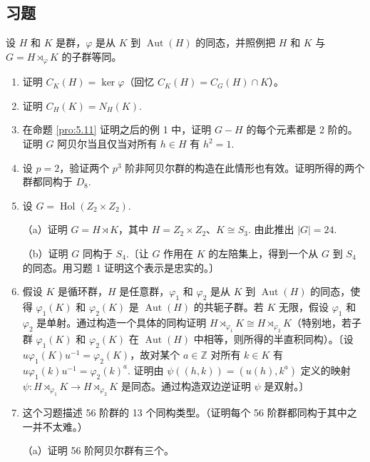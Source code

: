 \subsection*{习题}
设 \(H\) 和 \(K\) 是群，\(\varphi\) 是从 \(K\) 到 \(\operatorname{Aut}(H)\) 的同态，并照例把 \(H\) 和 \(K\) 与 \(G = H \rtimes_\varphi K\) 的子群等同。

\begin{enumerate}
\item 证明 \(C_K(H) = \ker \varphi\)（回忆 \(C_K(H) = C_G(H) \cap K\)）。

\item 证明 \(C_H(K) = N_H(K)\).

\item 在命题 \ref{pro:5.11} 证明之后的例 1 中，证明 \(G - H\) 的每个元素都是 2 阶的。证明 \(G\) 阿贝尔当且仅当对所有 \(h \in H\) 有 \(h^2 = 1\).

\item 设 \(p = 2\)，验证两个 \(p^3\) 阶非阿贝尔群的构造在此情形也有效。证明所得的两个群都同构于 \(D_8\).

\item 设 \(G = \operatorname{Hol}(Z_2 \times Z_2)\).

（a）证明 \(G = H \rtimes K\)，其中 \(H = Z_2 \times Z_2\)、\(K \cong S_3\). 由此推出 \(|G| = 24\).

（b）证明 \(G\) 同构于 \(S_4\).〔让 \(G\) 作用在 \(K\) 的左陪集上，得到一个从 \(G\) 到 \(S_4\) 的同态。用习题 1 证明这个表示是忠实的。〕

\item 假设 \(K\) 是循环群，\(H\) 是任意群，\(\varphi_1\) 和 \(\varphi_2\) 是从 \(K\) 到 \(\operatorname{Aut}(H)\) 的同态，使得 \(\varphi_1(K)\) 和 \(\varphi_2(K)\) 是 \(\operatorname{Aut}(H)\) 的共轭子群。若 \(K\) 无限，假设 \(\varphi_1\) 和 \(\varphi_2\) 是单射。通过构造一个具体的同构证明 \(H \rtimes_{\varphi_1} K \cong H \rtimes_{\varphi_2} K\)（特别地，若子群 \(\varphi_1(K)\) 和 \(\varphi_2(K)\) 在 \(\operatorname{Aut}(H)\) 中相等，则所得的半直积同构）。〔设 \(u\varphi_1(K)u^{-1} = \varphi_2(K)\)，故对某个 \(a \in \mathbb{Z}\) 对所有 \(k \in K\) 有 \(u\varphi_1(k)u^{-1} = \varphi_2(k)^a\). 证明由 \(\psi((h, k)) = (u(h), k^a)\) 定义的映射 \(\psi : H \rtimes_{\varphi_1} K \to H \rtimes_{\varphi_2} K\) 是同态。通过构造双边逆证明 \(\psi\) 是双射。〕

\item 这个习题描述 56 阶群的 13 个同构类型。（证明每个 56 阶群都同构于其中之一并不太难。）

（a）证明 56 阶阿贝尔群有三个。


\end{enumerate}
